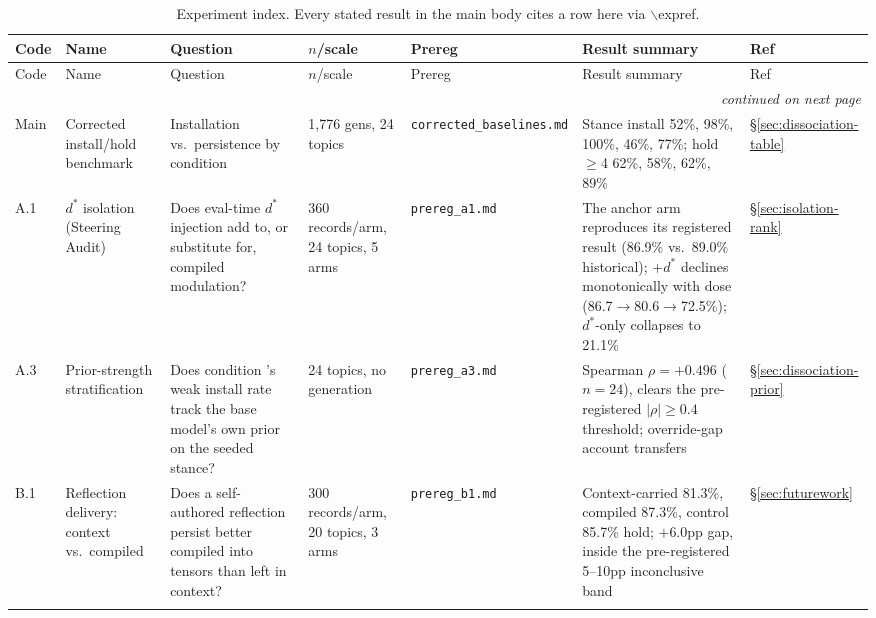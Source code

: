 \begingroup
\small
\setlength{\tabcolsep}{3pt}
\begin{longtable}{@{}p{}p{}p{}p{}p{}p{}p{}@{}}
\caption{Experiment index. Every stated result in the main body cites a row here via
\(\backslash\)expref{}.}
\label{tab:expindex}\\
\toprule
Code & Name & Question & \(n\)/scale & Prereg & Result summary & Ref \\
\midrule
\endfirsthead
\toprule
Code & Name & Question & \(n\)/scale & Prereg & Result summary & Ref \\
\midrule
\endhead
\midrule
\multicolumn{7}{r}{\textit{continued on next page}} \\
\endfoot
\bottomrule
\endlastfoot

\label{app:exp-main}Main &
Corrected install/hold benchmark &
Installation vs.\ persistence by condition &
1{,}776 gens, 24 topics &
\texttt{corrected\_\allowbreak baselines.md} &
Stance install \condA{} 52\%, \condB{} 98\%, \condD{} 100\%, \condC{} 46\%, \condF{}
77\%; hold \(\ge\)4 \condA{} 62\%, \condB{} 58\%, \condD{} 62\%, \condF{} 89\% &
\S\ref{sec:dissociation-table} \\
\addlinespace

\label{app:exp-a1}A.1 &
\(d^*\) isolation (Steering Audit) &
Does eval-time \(d^*\) injection add to, or substitute for, compiled modulation? &
360 records/arm, 24 topics, 5 arms &
\texttt{prereg\_a1.md} &
The \condF{} anchor arm reproduces its registered result (86.9\% vs.\ 89.0\% historical); \condF{}+\(d^*\) declines
monotonically with dose (86.7\(\to\)80.6\(\to\)72.5\%); \(d^*\)-only collapses to 21.1\% &
\S\ref{sec:isolation-rank} \\
\addlinespace

\label{app:exp-a3}A.3 &
Prior-strength stratification &
Does condition \condC{}'s weak install rate track the base model's own prior on the
seeded stance? &
24 topics, no generation &
\texttt{prereg\_a3.md} &
Spearman \(\rho = +0.496\) (\(n=24\)), clears the pre-registered \(|\rho|\ge0.4\)
threshold; override-gap account transfers &
\S\ref{sec:dissociation-prior} \\
\addlinespace

\label{app:exp-b1}B.1 &
Reflection delivery: context vs.\ compiled &
Does a self-authored reflection persist better compiled into tensors than left in
context? &
300 records/arm, 20 topics, 3 arms &
\texttt{prereg\_b1.md} &
Context-carried 81.3\%, compiled 87.3\%, control 85.7\% hold; \(+6.0\)pp gap, inside the
pre-registered 5--10pp inconclusive band &
\S\ref{sec:futurework} \\
\addlinespace


\end{longtable}
